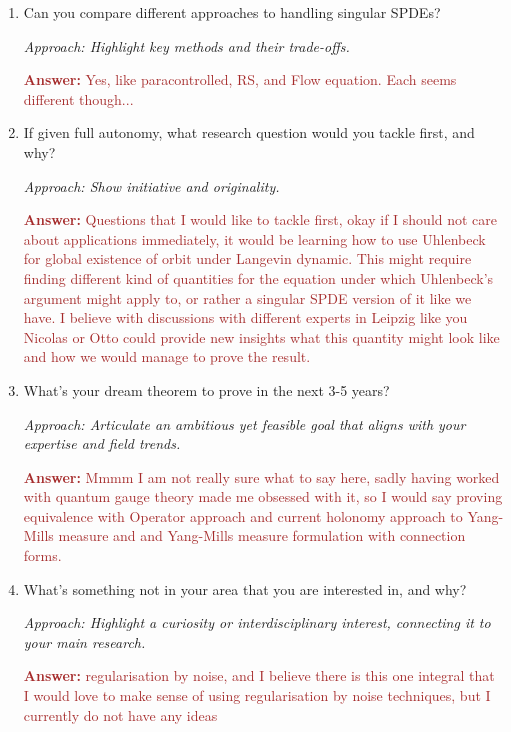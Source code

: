 \documentclass[12pt]{article}
\numberwithin{equation}{section}
\newcommand{\brown}[1]{\textcolor{brown}{#1}}
\begin{document}
\begin{enumerate}
    \item Can you compare different approaches to handling singular SPDEs?
    
    \textit{Approach: Highlight key methods and their trade-offs.}

    \brown{\textbf{Answer:}  Yes, like paracontrolled, RS, and Flow equation. Each seems different though...}

    \item If given full autonomy, what research question would you tackle first, and why?

    \textit{Approach: Show initiative and originality.} 
    
    \brown{\textbf{Answer:} Questions that I would like to tackle first, okay if I should not care about applications immediately, it would be learning how to use Uhlenbeck for global existence of orbit under Langevin dynamic. This might require finding different kind of quantities for the equation under which Uhlenbeck's argument might apply to, or rather a singular SPDE version of it like we have. I believe with discussions with different experts in Leipzig like you Nicolas or Otto could provide new insights what this quantity might look like and how we would manage to prove the result. }
    
    

    \item What’s your dream theorem to prove in the next 3-5 years?
    
    \textit{Approach: Articulate an ambitious yet feasible goal that aligns with your expertise and field trends.}

    \brown{\textbf{Answer:} Mmmm I am not really sure what to say here, sadly having worked with quantum gauge theory made me obsessed with it, so I would say proving equivalence with Operator approach and current holonomy approach to Yang-Mills measure and and Yang-Mills measure formulation with connection forms.} 
 

    \item What’s something not in your area that you are interested in, and why?
    
    \textit{Approach: Highlight a curiosity or interdisciplinary interest, connecting it to your main research.}

    \brown{\textbf{Answer:} regularisation by noise, and I believe there is this one integral that I would love to make sense of using regularisation by noise techniques, but I currently do not have any ideas}


\end{enumerate}
\end{document}
